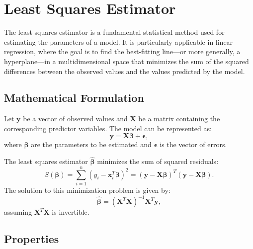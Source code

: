 \documentclass[12pt,a4paper,oneside,onecolumn]{book}
\begin{document}


\chapter{Least Squares Estimator}

The least squares estimator is a fundamental statistical method used for estimating the parameters of a model. It is particularly applicable in linear regression, where the goal is to find the best-fitting line---or more generally, a hyperplane---in a multidimensional space that minimizes the sum of the squared differences between the observed values and the values predicted by the model.

\section{Mathematical Formulation}

Let \( \mathbf{y} \) be a vector of observed values and \( \mathbf{X} \) be a matrix containing the corresponding predictor variables. The model can be represented as:
\[ \mathbf{y} = \mathbf{X}\boldsymbol{\beta} + \boldsymbol{\epsilon}, \]
where \( \boldsymbol{\beta} \) are the parameters to be estimated and \( \boldsymbol{\epsilon} \) is the vector of errors.

The least squares estimator \( \hat{\boldsymbol{\beta}} \) minimizes the sum of squared residuals:
\[ S(\boldsymbol{\beta}) = \sum_{i=1}^n (y_i - \mathbf{x}_i^T \boldsymbol{\beta})^2 = (\mathbf{y} - \mathbf{X}\boldsymbol{\beta})^T (\mathbf{y} - \mathbf{X}\boldsymbol{\beta}). \]
The solution to this minimization problem is given by:
\[ \hat{\boldsymbol{\beta}} = (\mathbf{X}^T\mathbf{X})^{-1}\mathbf{X}^T\mathbf{y}, \]
assuming \( \mathbf{X}^T\mathbf{X} \) is invertible.

\section{Properties}
\end{document}
